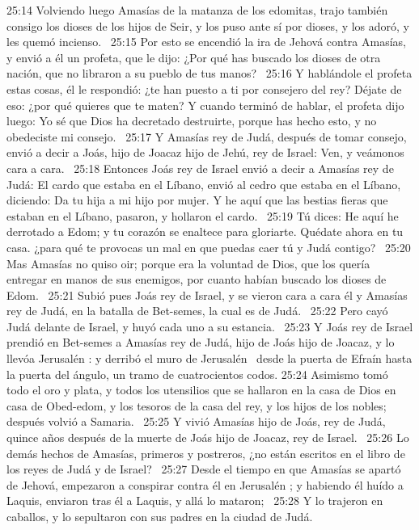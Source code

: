 																									25:14 Volviendo luego Amasías de la matanza de los edomitas, trajo también consigo los dioses de los hijos de Seir, y los puso ante sí por dioses, y los adoró, y les quemó incienso.  
																									25:15 Por esto se encendió la ira de Jehová contra Amasías, y envió a él un profeta, que le dijo: ¿Por qué has buscado los dioses de otra nación, que no libraron a su pueblo de tus manos?  
																									25:16 Y hablándole el profeta estas cosas, él le respondió: ¿te han puesto a ti por consejero del rey? Déjate de eso: ¿por qué quieres que te maten? Y cuando terminó de hablar, el profeta dijo luego: Yo sé que Dios ha decretado destruirte, porque has hecho esto, y no obedeciste mi consejo.  
																									25:17 Y Amasías rey de Judá, después de tomar consejo, envió a decir a Joás, hijo de Joacaz hijo de Jehú, rey de Israel: Ven, y veámonos cara a cara.  
																									25:18 Entonces Joás rey de Israel envió a decir a Amasías rey de Judá: El cardo que estaba en el Líbano, envió al cedro que estaba en el Líbano, diciendo: Da tu hija a mi hijo por mujer. Y he aquí que las bestias fieras que estaban en el Líbano, pasaron, y hollaron el cardo.  
																									25:19 Tú dices: He aquí he derrotado a Edom; y tu corazón se enaltece para gloriarte. Quédate ahora en tu casa. ¿para qué te provocas un mal en que puedas caer tú y Judá contigo?  
																									25:20 Mas Amasías no quiso oir; porque era la voluntad de Dios, que los quería entregar en manos de sus enemigos, por cuanto habían buscado los dioses de Edom.  
																									25:21 Subió pues Joás rey de Israel, y se vieron cara a cara él y Amasías rey de Judá, en la batalla de Bet-semes, la cual es de Judá.  
																									25:22 Pero cayó Judá delante de Israel, y huyó cada uno a su estancia.  
																									25:23 Y Joás rey de Israel prendió en Bet-semes a Amasías rey de Judá, hijo de Joás hijo de Joacaz, y lo  llevóa Jerusalén : y derribó el muro de Jerusalén  desde la puerta de Efraín hasta la puerta del ángulo, un tramo de cuatrocientos codos. 
																									25:24 Asimismo tomó todo el oro y plata, y todos los utensilios que se hallaron en la casa de Dios en casa de Obed-edom, y los tesoros de la casa del rey, y los hijos de los nobles; después volvió a Samaria.  
																									25:25 Y vivió Amasías hijo de Joás, rey de Judá, quince años después de la muerte de Joás hijo de Joacaz, rey de Israel.  
																									25:26 Lo demás hechos de Amasías, primeros y postreros, ¿no están escritos en el libro de los reyes de Judá y de Israel?  
																									25:27 Desde el tiempo en que Amasías se apartó de Jehová, empezaron a conspirar contra él en Jerusalén ; y habiendo él huído a Laquis, enviaron tras él a Laquis, y allá lo mataron;  
																									25:28 Y lo trajeron en caballos, y lo sepultaron con sus padres en la ciudad de Judá.  
